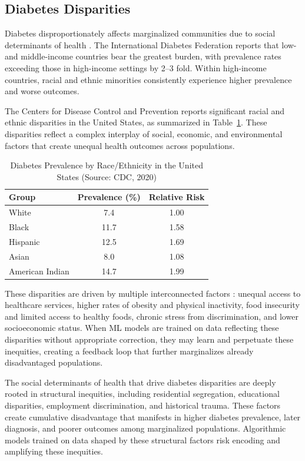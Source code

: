 \subsection{Diabetes Disparities}

Diabetes disproportionately affects marginalized communities due to social 
determinants of health \cite{narayan2017}. The International Diabetes 
Federation \cite{idf2021} reports that low- and middle-income countries bear 
the greatest burden, with prevalence rates exceeding those in high-income 
settings by 2--3 fold. Within high-income countries, racial and ethnic 
minorities consistently experience higher prevalence and worse outcomes.

The Centers for Disease Control and Prevention \cite{cdc2020} reports 
significant racial and ethnic disparities in the United States, as summarized 
in Table~\ref{tab:diabetes_disparities}. These disparities reflect a complex 
interplay of social, economic, and environmental factors that create unequal 
health outcomes across populations.

\begin{table}[H]
\centering
\caption{Diabetes Prevalence by Race/Ethnicity in the United States 
(Source: CDC, 2020)}
\begin{tabular}{lcc}
\toprule
\textbf{Group} & \textbf{Prevalence (\%)} & \textbf{Relative Risk} \\
\midrule
White & 7.4 & 1.00 \\
Black & 11.7 & 1.58 \\
Hispanic & 12.5 & 1.69 \\
Asian & 8.0 & 1.08 \\
American Indian & 14.7 & 1.99 \\
\bottomrule
\end{tabular}
\label{tab:diabetes_disparities}
\end{table}

These disparities are driven by multiple interconnected factors 
\cite{hill2022}: unequal access to healthcare services, higher rates of 
obesity and physical inactivity, food insecurity and limited access to 
healthy foods, chronic stress from discrimination, and lower socioeconomic 
status. When ML models are trained on data reflecting these disparities 
without appropriate correction, they may learn and perpetuate these inequities, 
creating a feedback loop that further marginalizes already disadvantaged 
populations.

The social determinants of health that drive diabetes disparities are deeply 
rooted in structural inequities, including residential segregation, 
educational disparities, employment discrimination, and historical trauma. 
These factors create cumulative disadvantage that manifests in higher 
diabetes prevalence, later diagnosis, and poorer outcomes among marginalized 
populations. Algorithmic models trained on data shaped by these structural 
factors risk encoding and amplifying these inequities.

